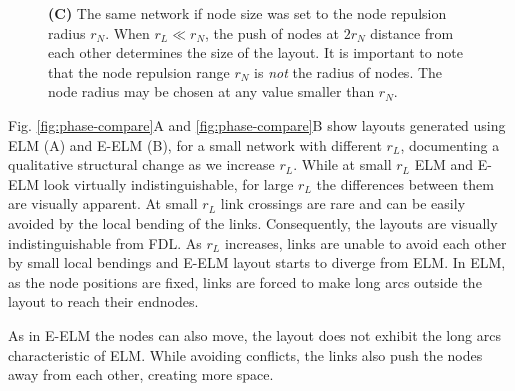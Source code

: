 \documentclass[nofootinbib,preprint,floatfix,titlepage,endfloats]{revtex4} %
\begin{document}
\begin{figure}
{    {\bf (C)} The same network if node size was set to the node repulsion radius $r_N$. 
    When $r_L\ll r_N$, the push of nodes at $2r_N$ distance from each other determines the size of the layout. 
    It is important to note that the node repulsion range $r_N$ is {\em not} the radius of nodes. The node radius may be chosen at any value smaller than $ r_N$. %
    }
    \label{fig:lattice}
    \vspace{4cm}
\end{figure}

Fig. \ref{fig:phase-compare}A and \ref{fig:phase-compare}B show layouts generated using ELM (A) and E-ELM (B), for a small %
network %
with different $r_L$, documenting a qualitative structural change as we increase $r_L$. 
While at small $r_L$ ELM and E-ELM look virtually indistinguishable, for large $r_L$ the differences between them are visually apparent. 
 At small $r_L$ link crossings are rare and can be easily avoided by the local bending of the links. Consequently, 
the layouts are visually indistinguishable from FDL. 
As $r_L$ increases, links are unable to avoid each other by small local bendings and E-ELM layout starts to diverge from ELM. 
In ELM, as the node positions are fixed, links are forced to make long arcs outside the layout to reach their endnodes.

As in E-ELM the nodes can also move, the layout does not exhibit the long arcs characteristic of ELM. 
While avoiding conflicts, the links also push the nodes away from each other, creating more space. 
\end{document}
